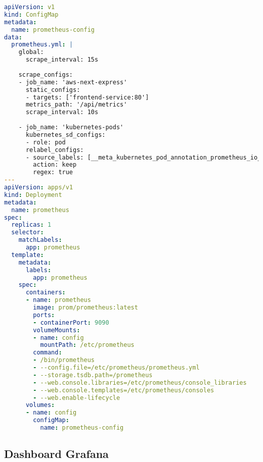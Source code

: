 \begin{lstlisting}[language=YAML, caption=monitoring/prometheus.yaml]
apiVersion: v1
kind: ConfigMap
metadata:
  name: prometheus-config
data:
  prometheus.yml: |
    global:
      scrape_interval: 15s
    
    scrape_configs:
    - job_name: 'aws-next-express'
      static_configs:
      - targets: ['frontend-service:80']
      metrics_path: '/api/metrics'
      scrape_interval: 10s
      
    - job_name: 'kubernetes-pods'
      kubernetes_sd_configs:
      - role: pod
      relabel_configs:
      - source_labels: [__meta_kubernetes_pod_annotation_prometheus_io_scrape]
        action: keep
        regex: true
---
apiVersion: apps/v1
kind: Deployment
metadata:
  name: prometheus
spec:
  replicas: 1
  selector:
    matchLabels:
      app: prometheus
  template:
    metadata:
      labels:
        app: prometheus
    spec:
      containers:
      - name: prometheus
        image: prom/prometheus:latest
        ports:
        - containerPort: 9090
        volumeMounts:
        - name: config
          mountPath: /etc/prometheus
        command:
        - /bin/prometheus
        - --config.file=/etc/prometheus/prometheus.yml
        - --storage.tsdb.path=/prometheus
        - --web.console.libraries=/etc/prometheus/console_libraries
        - --web.console.templates=/etc/prometheus/consoles
        - --web.enable-lifecycle
      volumes:
      - name: config
        configMap:
          name: prometheus-config
\end{lstlisting}

\subsection{Dashboard Grafana}

